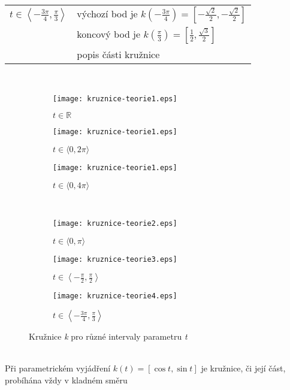 \begin{tabular}{ll}
	$t \in \left\langle -\frac{3\pi}{4}, \frac{\pi}{3}\right\rangle$
	                               & výchozí bod je $k\left(-\frac{3\pi}{4}\right)  = \left[-\frac{\sqrt{2}}{2}, -\frac{\sqrt{2}}{2} \right]$               \\ 
	                               & koncový bod je $k\left(\frac{\pi}{3}\right)  = \left[\frac{1}{2}, \frac{\sqrt{3}}{2} \right]$                           \\ 
	                               & popis části kružnice                                                                                                  \\ 
\end{tabular}\\
\begin{figure}
	\centering
	\begin{subfigure}[b]{0.3\textwidth}
		\texttt{[image: kruznice-teorie1.eps]}
		\caption{$t \in \mathbb{R}$}
	\end{subfigure}%
	\quad
	\begin{subfigure}[b]{0.3\textwidth}
		\texttt{[image: kruznice-teorie1.eps]}
		\caption{$t \in \langle 0, 2\pi\rangle$}
	\end{subfigure}%
	\quad
	\begin{subfigure}[b]{0.3\textwidth}
		\texttt{[image: kruznice-teorie1.eps]}
		\caption{$t \in \langle 0, 4\pi\rangle$}
	\end{subfigure}%
	\\
	\begin{subfigure}[b]{0.33\textwidth}
		\texttt{[image: kruznice-teorie2.eps]}
		\caption{$t \in \langle 0, \pi\rangle$}
	\end{subfigure}%
	\begin{subfigure}[b]{0.33\textwidth}
		\texttt{[image: kruznice-teorie3.eps]}
		\caption{$t \in \left\langle -\frac{\pi}{2}, \frac{\pi}{2}\right\rangle$}
	\end{subfigure}%
	\begin{subfigure}[b]{0.33\textwidth}
		\texttt{[image: kruznice-teorie4.eps]}
		\caption{$t \in \left\langle -\frac{3\pi}{4}, \frac{\pi}{3}\right\rangle$}
	\end{subfigure}%
	\caption{Kružnice \textit{k} pro různé intervaly parametru \textit{t}}
\end{figure}
\\
\noindent{}Při parametrickém vyjádření $k(t) = [\cos{t}, \sin{t}]$ je kružnice, či její část, probíhána vždy v kladném směru

